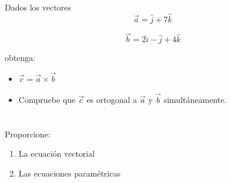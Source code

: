 \documentclass[12pt]{article}
\begin{document}
\begin{itemize}
\section{}

Dados los vectores \\

\[\vec{a} = \hat{j}+ 7\hat{k}\]

\[\vec{b} = 2\hat{i} - \hat{j}+ 4\hat{k}\]

obtenga:

\begin{itemize}

\item $\vec{c}=\vec{a} \times \vec{b}$

\item Compruebe que $\vec{c}$ es ortogonal a $\vec{a}$ y $\vec{b}$ simultáneamente.

\end{itemize}

\section{}

Proporcione:

\begin{enumerate}

\item La ecuación vectorial

\item Las ecuaciones paramétricas


\end{enumerate}
\end{itemize}
\end{document}

